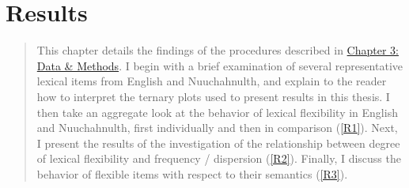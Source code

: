 \chapter{Results}
\label{ch:results}

\blockquote{This chapter details the findings of the procedures described in \hyperref[ch:methods]{Chapter 3: Data \& Methods}. I begin with a brief examination of several representative lexical items from English and Nuuchahnulth, and explain to the reader how to interpret the ternary plots used to present results in this thesis. I then take an aggregate look at the behavior of lexical flexibility in English and Nuuchahnulth, first individually and then in comparison (\ref{R1}). Next, I present the results of the investigation of the relationship between degree of lexical flexibility and frequency / dispersion (\ref{R2}). Finally, I discuss the behavior of flexible items with respect to their semantics (\ref{R3}).}
